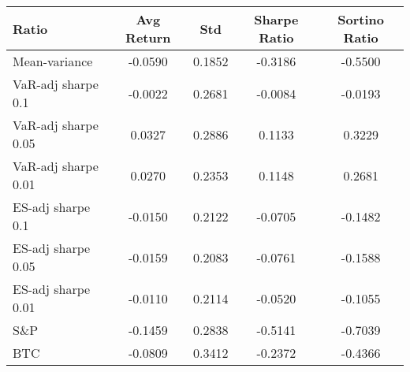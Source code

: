 \begin{tabular}{lcccc}
\toprule
Ratio & Avg Return & Std & Sharpe Ratio & Sortino Ratio\\
\midrule
Mean-variance & -0.0590 & 0.1852 & -0.3186 & -0.5500\\
VaR-adj sharpe 0.1 & -0.0022 & 0.2681 & -0.0084 & -0.0193\\
VaR-adj sharpe 0.05 & 0.0327 & 0.2886 & 0.1133 & 0.3229\\
VaR-adj sharpe 0.01 & 0.0270 & 0.2353 & 0.1148 & 0.2681\\
ES-adj sharpe 0.1 & -0.0150 & 0.2122 & -0.0705 & -0.1482\\
ES-adj sharpe 0.05 & -0.0159 & 0.2083 & -0.0761 & -0.1588\\
ES-adj sharpe 0.01 & -0.0110 & 0.2114 & -0.0520 & -0.1055\\
S\&P & -0.1459 & 0.2838 & -0.5141 & -0.7039\\
BTC & -0.0809 & 0.3412 & -0.2372 & -0.4366\\
\bottomrule
\end{tabular}
